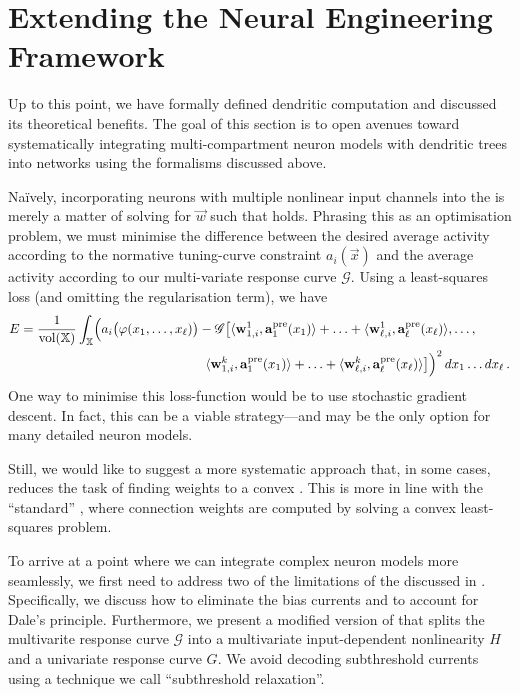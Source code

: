 
\section{Extending the Neural Engineering Framework}
\label{sec:nef_extension}

Up to this point, we have formally defined dendritic computation and discussed its theoretical benefits.
The goal of this section is to open avenues toward systematically integrating multi-compartment neuron models with dendritic trees into \NEF networks using the formalisms discussed above.

Na\"ively, incorporating neurons with multiple nonlinear input channels into the \NEF is merely a matter of solving for $\vec w$ such that  holds.
Phrasing this as an optimisation problem, we must minimise the difference between the desired average activity according to the normative tuning-curve constraint $a_i(\vec x)$ and the average activity according to our multi-variate response curve $\mathscr{G}$.
Using a least-squares loss (and omitting the regularisation term), we have
\begin{align}
	\begin{aligned}
	E &=
	\frac{1}{\vol(\Xrepr)} \int_{\Xrepr} \Bigl( a_i\bigl(\phi(x_1, \ldots, x_\ell)\bigr) -
	\mathscr{G} \bigl[
		\langle \vec w_{1, i}^1, \vec a^\mathrm{pre}_1(x_1) \rangle + \ldots +
		\langle \vec w_{\ell, i}^1, \vec a^\mathrm{pre}_\ell(x_\ell) \rangle, \ldots,\\
	&~\hspace{13.825em}
		\langle \vec w_{1, i}^k, \vec a^\mathrm{pre}_1(x_1) \rangle + \ldots +
		\langle \vec w_{\ell, i}^k, \vec a^\mathrm{pre}_\ell(x_\ell) \rangle
	\bigr] \Bigr)^2 \,dx_1 \ldots dx_\ell \,.
	\end{aligned}
	\label{eqn:dendritic_computation_optimisation}
\end{align}
One way to minimise this loss-function would be to use stochastic gradient descent.
In fact, this can be a viable strategy---and may be the only option for many detailed neuron models.

Still, we would like to suggest a more systematic approach that, in some cases, reduces the task of finding weights to a convex \qprog.
This is more in line with the \enquote{standard} \NEF, where connection weights are computed by solving a convex least-squares problem.

To arrive at a point where we can integrate complex neuron models more seamlessly, we first need to address two of the limitations of the \NEF discussed in .
Specifically, we discuss how to eliminate the bias currents and to account for Dale's principle.
Furthermore, we present a modified version of  that splits the multivarite response curve $\mathscr{G}$ into a multivariate input-dependent nonlinearity $H$ and a univariate response curve $G$.
We avoid decoding subthreshold currents using a technique we call \enquote{subthreshold relaxation}.

